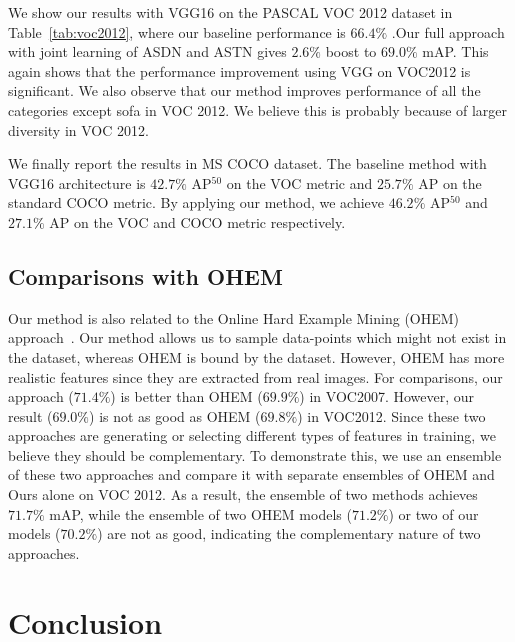 \documentclass[10pt,twocolumn,letterpaper]{article}
\begin{document}
We show our results with VGG16 on the PASCAL VOC 2012 dataset in Table~\ref{tab:voc2012}, where our baseline performance is $66.4\%$ .Our full approach with joint learning of ASDN and ASTN gives $2.6\%$ boost to $69.0\%$ mAP. This again shows that the performance improvement using VGG on VOC2012 is significant. We also observe that our method improves performance of all the categories except sofa in VOC 2012. We believe this is probably because of larger diversity in VOC 2012.



We finally report the results in MS COCO dataset. The baseline method with VGG16 architecture is  $42.7\%$ AP$^{50}$ on the VOC metric and $25.7\%$ AP on the standard COCO metric. By applying our method, we achieve $46.2\%$ AP$^{50}$ and $27.1\%$ AP on the VOC and COCO metric respectively. 

\vspace{-0.05in}
\subsection{Comparisons with OHEM}
\vspace{-0.05in}
Our method is also related to the Online Hard Example Mining (OHEM) approach~\cite{shrivastavaOHEM}. Our method allows us to sample data-points which might not exist in the dataset, whereas OHEM is bound by the dataset. However, OHEM has more realistic features since they are extracted from real images. For comparisons, our approach ($71.4\%$) is better than OHEM ($69.9\%$) in VOC2007. However, our result ($69.0\%$) is not as good as OHEM ($69.8\%$) in VOC2012. Since these two approaches are generating or selecting different types of features in training,  we believe they should be complementary. To demonstrate this, we use an ensemble of these two approaches and compare it with separate ensembles of OHEM and Ours alone on VOC 2012. As a result, the ensemble of two methods achieves $71.7\%$ mAP, while the ensemble of two OHEM models ($71.2\%$) or two of our models ($70.2\%$) are not as good, indicating the complementary nature of two approaches. 









 
\vspace{-0.05in}
\section{Conclusion}
\vspace{-0.05in}
\end{document}
